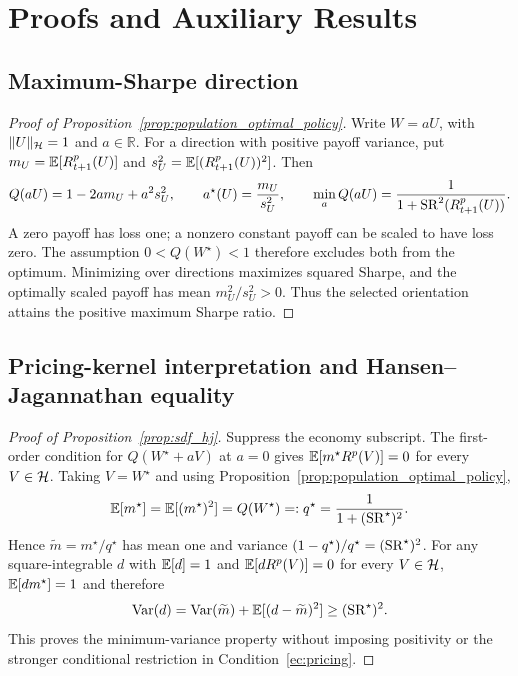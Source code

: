 \section{Proofs and Auxiliary Results}
\label{app:theory}
\label{app:learning_proof}
\setcounter{equation}{0}

\subsection{Maximum-Sharpe direction}
\label{app:maximum_sharpe}

\begin{proof}[Proof of Proposition~\ref{prop:population_optimal_policy}]
Write $W=aU$, with $\|U\|_{\mathcal{H}}=1$ and $a\in\mathbb R$.
For a direction with positive payoff variance, put
$m_U=\mathbb{E}[R^p_{t+1}(U)]$ and $s_U^2=\mathbb{E}[(R^p_{t+1}(U))^2]$.
Then
\[
Q(aU)=1-2am_U+a^2s_U^2,
\qquad
a^\star(U)=\frac{m_U}{s_U^2},
\qquad
\min_a Q(aU)=\frac{1}{1+\operatorname{SR}^2(R^p_{t+1}(U))}.
\]
A zero payoff has loss one; a nonzero constant payoff can be scaled to
have loss zero. The assumption $0<Q(W^\star)<1$ therefore excludes both
from the optimum. Minimizing over directions maximizes squared Sharpe,
and the optimally scaled payoff has mean $m_U^2/s_U^2>0$.
Thus the selected orientation attains the positive maximum Sharpe ratio.
\end{proof}

\subsection{Pricing-kernel interpretation and Hansen--Jagannathan equality}
\label{app:sdf_hj}

\begin{proof}[Proof of Proposition~\ref{prop:sdf_hj}]
Suppress the economy subscript. The first-order condition for
$Q(W^\star+aV)$ at $a=0$ gives
$\mathbb{E}[m^\star R^p(V)]=0$ for every $V\in\mathcal{H}$.
Taking $V=W^\star$ and using Proposition~\ref{prop:population_optimal_policy},
\[
\mathbb{E}[m^\star]=\mathbb{E}[(m^\star)^2]=Q(W^\star)
=:q^\star=\frac{1}{1+(\operatorname{SR}^\star)^2}.
\]
Hence $\widetilde m=m^\star/q^\star$ has mean one and
variance $(1-q^\star)/q^\star=(\operatorname{SR}^\star)^2$.
For any square-integrable $d$ with $\mathbb{E}[d]=1$ and
$\mathbb{E}[dR^p(V)]=0$ for every $V\in\mathcal{H}$,
$\mathbb{E}[dm^\star]=1$ and therefore
\[
\operatorname{Var}(d)=\operatorname{Var}(\widetilde m)+\mathbb{E}[(d-\widetilde m)^2]
\geq(\operatorname{SR}^\star)^2.
\]
This proves the minimum-variance property without imposing positivity
or the stronger conditional restriction in Condition~\ref{ec:pricing}.
\end{proof}

